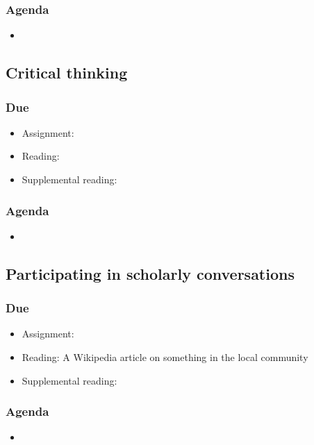 \documentclass[12pt,article,oneside]{memoir}
\begin{document}
\subsubsection{Agenda}
\begin{itemize}
\item 
\end{itemize}



\subsection{Critical thinking}
\subsubsection{Due}
\begin{itemize}
 \item Assignment: 
 \item Reading:
 \item Supplemental reading:
\end{itemize}

\subsubsection{Agenda}
\begin{itemize}
\item 
\end{itemize}


\subsection{Participating in scholarly conversations}
\subsubsection{Due}
\begin{itemize}
 \item Assignment:
 \item Reading: A Wikipedia article on something in the local community
 \item Supplemental reading:
\end{itemize}

\subsubsection{Agenda}
\begin{itemize}
\item 
\end{itemize}



\newpage
\renewcommand{\bibname}{Reading list}
{}

\end{document}
